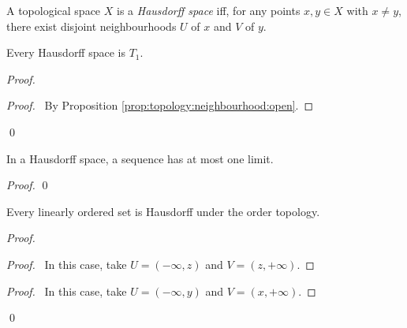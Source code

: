 \begin{df}
  A topological space $X$ is a \emph{Hausdorff space} iff, for any points $x,
  y
  \in X$ with $x \neq y$, there exist disjoint neighbourhoods $U$ of $x$ and
  $V$
  of $y$.
\end{df}

\begin{thm}
  \label{thm:topology:Hausdorff:T1}
  Every Hausdorff space is $T_1$.
\end{thm}

\begin{proof}
  \pf
  \qedstep
  \begin{proof}
    \pf\ By Proposition \ref{prop:topology:neighbourhood:open}.
  \end{proof}
  \qed
\end{proof}

\begin{thm}
  In a Hausdorff space, a sequence has at most one limit.
\end{thm}

\begin{proof}
  \pf
  \qed
\end{proof}

\begin{thm}
  Every linearly ordered set is Hausdorff under the order topology.
\end{thm}

\begin{proof}
  \pf
  \begin{proof}
    \pf\ In this case, take $U = (-\infty, z)$ and $V = (z, +\infty)$.
  \end{proof}
  \begin{proof}
    \pf\ In this case, take $U = (-\infty, y)$ and $V = (x, +\infty)$.
  \end{proof}
  \qed
\end{proof}

